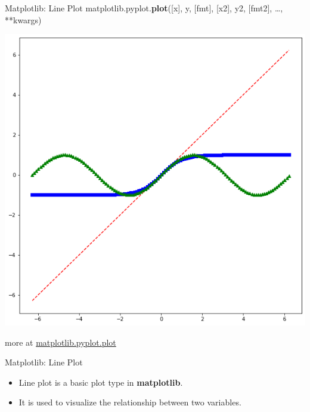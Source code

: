 \documentclass{beamer}
\begin{document}
    \begin{frame}[fragile]{Matplotlib: Line Plot}
        matplotlib.pyplot.\textbf{plot}([x], y, [fmt], [x2], y2, [fmt2], \dots, **kwargs)\\
        \begin{center}
            \includegraphics[width=\textwidth,height=0.6\textheight,keepaspectratio]{figures/Plot.png}\\
        \end{center}
        more at \href{https://matplotlib.org/stable/api/_as_gen/matplotlib.pyplot.plot.html}{matplotlib.pyplot.plot}
    \end{frame}
    \begin{frame}[fragile]{Matplotlib: Line Plot}
        \begin{itemize}
            \item Line plot is a basic plot type in \textbf{matplotlib}.
            \item It is used to visualize the relationship between two variables.
        \end{itemize}
    \end{frame}
\end{document}
